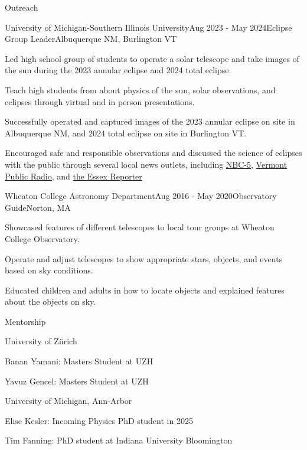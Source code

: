 \documentclass{resume} %
\begin{document}
\begin{rSection}{Outreach}

\begin{rSubsection}{University of Michigan-Southern Illinois University}{Aug 2023 - May 2024}{Eclipse Group Leader}{Albuquerque NM, Burlington VT}
    \item Led high school group of students to operate a solar telescope and take images of the sun during the 2023 annular eclipse and 2024 total eclipse.
    \item Teach high students from about physics of the sun, solar observations, and eclipses through virtual and in person presentations.
    \item Successfully operated and captured images of the 2023 annular eclipse on site in Albuquerque NM, and 2024 total eclipse on site in Burlington VT.
    \item Encouraged safe and responsible observations and discussed the science of eclipses with the public through several local news outlets, including \href{https://www.mynbc5.com/article/total-eclipse-nasa/60433342?utm_campaign=snd-autopilot}{NBC-5}, \href{https://www.vermontpublic.org/local-news/2024-04-10/nasa-volunteer-photo-eclipse-burlington-sun-atmosphere}{Vermont Public Radio}, and \href{https://www.essexreporter.com/news/physics-masters-student-collects-data-for-nasa-and-national-science-foundation-from-eclipse-in-burlington/article_1b7a72a8-76d5-52b7-8ffa-886491f640a4.html}{the Essex Reporter}
\end{rSubsection}



\begin{rSubsection}{Wheaton College Astronomy Department}{Aug 2016 - May 2020}{Observatory Guide}{Norton, MA}
    \item Showcased features of different telescopes to local tour groups at Wheaton College Observatory.
    \item Operate and adjust telescopes to show appropriate stars, objects, and events based on sky conditions.
    \item Educated children and adults in how to locate objects and explained features about the objects on sky.

\end{rSubsection}
\end{rSection}

\begin{rSection}{Mentorship}
\begin{rSubsection}{University of Zürich}{}{}{}
    \item Banan Yamani: Masters Student at UZH
    \item Yavuz Gencel: Masters Student at UZH
\end{rSubsection}

\begin{rSubsection}{University of Michigan, Ann-Arbor}{}{}{}
    \item Elise Kesler: Incoming Physics PhD student in 2025
    \item Tim Fanning: PhD student at Indiana University Bloomington
\end{rSubsection}

\end{rSection}
\end{document}
